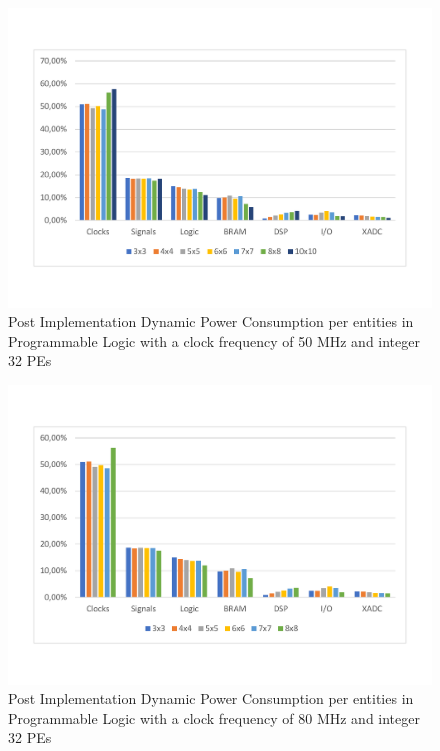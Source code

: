 \begin{figure}[!htbp]
\centering
\captionsetup{justification=centering}
\includegraphics[scale=0.6,angle=0]{./figure/graphs/power_pldyn_div_int32_freq_50mhz.pdf}
\caption{Post Implementation Dynamic Power Consumption per entities in Programmable Logic with a clock frequency of 50 MHz and integer 32 PEs}
\label{fig:dynpowint32ent50}
\end{figure}
\begin{figure}[!htbp]
\centering
\captionsetup{justification=centering}
\includegraphics[scale=0.6,angle=0]{./figure/graphs/power_pldyn_div_int32_freq_80mhz.pdf}
\caption{Post Implementation Dynamic Power Consumption per entities in Programmable Logic with a clock frequency of 80 MHz and integer 32 PEs}
\label{fig:dynpowint32ent80}
\end{figure}
